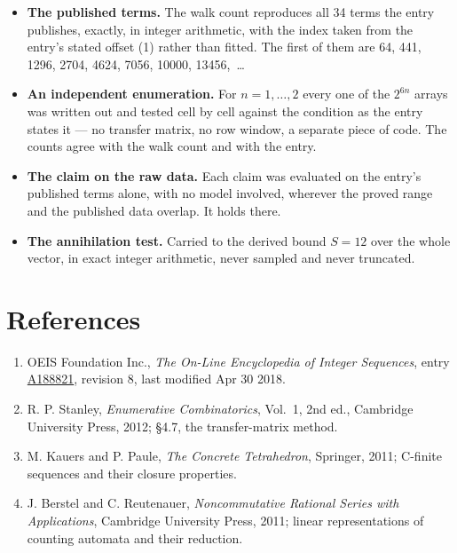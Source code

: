 \documentclass[11pt]{article}
\theoremstyle{definition}
\begin{document}
\begin{itemize}

\item {\bfseries The published terms.} The walk count reproduces all 34 terms the entry publishes, exactly, in integer arithmetic, with the index taken from the entry's stated offset (1) rather than fitted. The first of them are 64, 441, 1296, 2704, 4624, 7056, 10000, 13456,~\dots

\item {\bfseries An independent enumeration.} For $n = 1,\dots,2$ every one of the $2^{6n}$ arrays was written out and tested cell by cell against the condition as the entry states it --- no transfer matrix, no row window, a separate piece of code. The counts agree with the walk count and with the entry.

\item {\bfseries The claim on the raw data.} Each claim was evaluated on the entry's published terms alone, with no model involved, wherever the proved range and the published data overlap. It holds there.

\item {\bfseries The annihilation test.} Carried to the derived bound $S = 12$ over the whole vector, in exact integer arithmetic, never sampled and never truncated.

\end{itemize}

\section{References}

\begin{enumerate}

\item OEIS Foundation Inc., \emph{The On-Line Encyclopedia of Integer Sequences}, entry \href{https://oeis.org/A188821}{A188821}, revision 8, last modified Apr 30 2018.

\item R. P. Stanley, \emph{Enumerative Combinatorics}, Vol.~1, 2nd ed., Cambridge University Press, 2012; \S4.7, the transfer-matrix method.

\item M. Kauers and P. Paule, \emph{The Concrete Tetrahedron}, Springer, 2011; C-finite sequences and their closure properties.

\item J. Berstel and C. Reutenauer, \emph{Noncommutative Rational Series with Applications}, Cambridge University Press, 2011; linear representations of counting automata and their reduction.

\end{enumerate}
\end{document}

